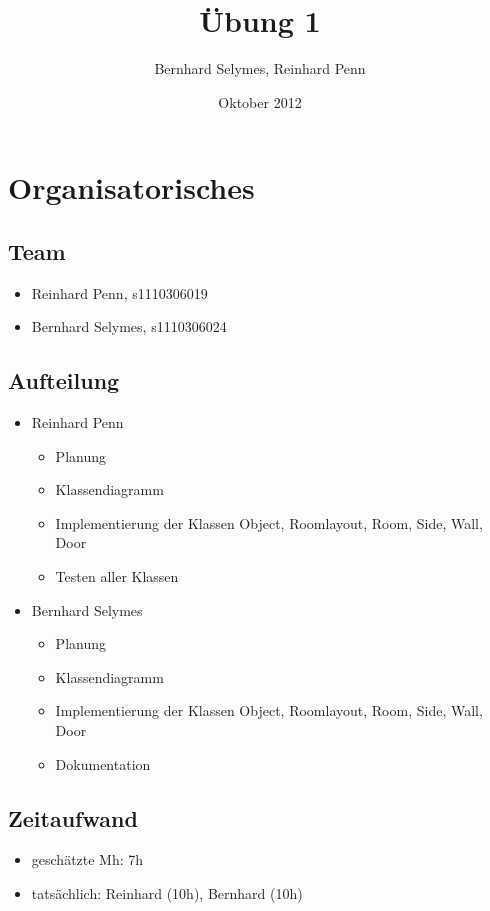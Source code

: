 \documentclass[12pt,a4paper]{article}
\begin{document}
\title{Übung 1}
\author{Bernhard Selymes, Reinhard Penn}
\date{Oktober 2012}

\normalsize

\newcommand{\CodePath}{../AdressManagement/AdressManagement/}

\section{Organisatorisches}

\subsection{Team}
	\begin {itemize} 
		\item Reinhard Penn, s1110306019 
		\item Bernhard Selymes, s1110306024
	\end {itemize}

\subsection{Aufteilung}
	\begin {itemize} 
		\item Reinhard Penn
			\begin {itemize}
				\item Planung
				\item Klassendiagramm
				\item Implementierung der Klassen Object, Roomlayout, Room, Side, Wall, Door
				\item Testen aller Klassen		
			\end {itemize}
		\item Bernhard Selymes
			\begin {itemize}
				\item Planung
				\item Klassendiagramm
				\item Implementierung der Klassen Object, Roomlayout, Room, Side, Wall, Door
				\item Dokumentation				
			\end {itemize}
	\end {itemize}


\subsection{Zeitaufwand}
	\begin {itemize}
		\item geschätzte Mh: 7h
		\item tatsächlich: Reinhard (10h), Bernhard  (10h)

	\end {itemize}
\end{document}
